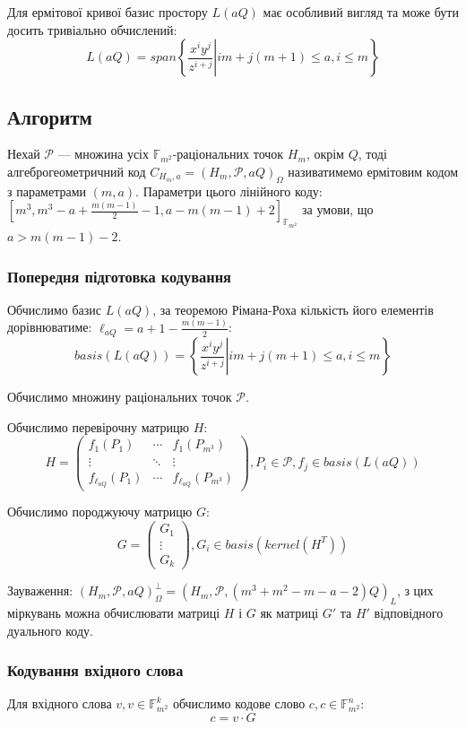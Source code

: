 \documentclass[a4paper,12pt,oneside]{article}
\begin{document}
Для ермітової кривої базис простору $L(aQ)$ має особливий вигляд та може бути досить тривіально обчислений:
$$ L(aQ) = span \left. \left \{ \frac{x^i y^j}{z^{i+j}} \right | i m + j (m + 1) \le a, i \le m \right \} $$


\subsection{Алгоритм}
Нехай $\mathcal{P}$ --- множина усіх $\mathbb{F}_{m^2}$-раціональних точок $H_m$, окрім $Q$, тоді алгеброгеометричний код 
$C_{H_{m}, a} = (H_m, \mathcal{P}, aQ)_\Omega$ називатимемо ермітовим кодом з параметрами $(m, a)$. Параметри цього лінійного коду:
$[m^3, m^3 - a + \frac{m(m-1)}{2} - 1, a - m(m-1) + 2]_{\mathbb{F}_{m^2}}$ за умови, що $ a > m(m-1) - 2$.
\subsubsection{Попередня підготовка кодування}
Обчислимо базис $L(aQ)$, за теоремою Рімана-Роха кількість його елементів дорівнюватиме: $\ell_{aQ}=a+1-\frac{m(m-1)}{2}$:
$$ basis(L(aQ)) = \left. \left \{ \frac{x^i y^j}{z^{i+j}} \right | i m + j (m + 1) \le a, i \le m \right \} $$

Обчислимо множину раціональних точок $\mathcal{P}$.

Обчислимо перевірочну матрицю $H$:
$$ 
H = 
\begin{pmatrix}
 f_1 (P_1) & \cdots & f_1(P_{m^3}) \\
 \vdots & \ddots & \vdots \\
 f_{\ell_{aQ}} (P_1) & \cdots & f_{\ell_{aQ}}(P_{m^3})
\end{pmatrix}, P_i \in \mathcal{P}, f_j \in basis(L(aQ))
$$

Обчислимо породжуючу матрицю $G$:
$$
G =
\begin{pmatrix}
    G_1 \\
    \vdots \\
    G_k
\end{pmatrix}, G_i \in basis(kernel(H^T))
$$

Зауваження: $(H_m, \mathcal{P}, aQ)_\Omega^\perp = (H_m, \mathcal{P}, (m^3+m^2-m-a-2)Q)_L$, з цих міркувань можна обчислювати матриці $H$ і $G$ як матриці 
$G'$ та $H'$ відповідного дуального коду.

\subsubsection{Кодування вхідного слова}
Для вхідного слова $v, v\in \mathbb{F}_{m^2}^k$ обчислимо кодове слово $c, c \in \mathbb{F}_{m^2}^n$:
$$c = v \cdot G$$
 
\end{document}
